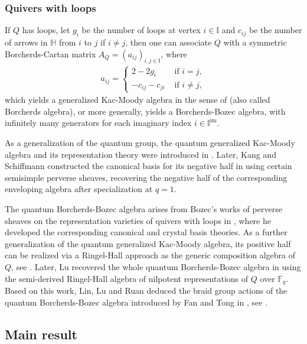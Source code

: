 \documentclass[12pt]{amsart}
\theoremstyle{definition}
\numberwithin{equation}{section}
\begin{document}
\subsubsection{Quivers with loops}\;

If $ Q $ has loops, let $ g_i $ be the number of loops at vertex $ i \in \mathbb{I} $ and $ c_{ij} $ be the number of arrows in $ \mathbb{H} $ from $ i $ to $ j $ if $ i \neq j $, then one can associate $
 Q $ with a symmetric Borcherds-Cartan matrix $ A_Q= (a_{ij})_{i,j \in \mathbb{I}} $, where
\begin{align*}
    a_{ij} = \begin{cases}
        2 - 2 g_i &\text{ if } i = j,\\
        -c_{ij}-c_{ji} &\text{ if } i \neq j,
    \end{cases}
\end{align*}
which yields a generalized Kac-Moody algebra in the sense of \cite{Borcherds88} (also called Borcherds algebra), or more generally, yields a Borcherds-Bozec algebra, with infinitely many generators for each imaginary index $ i \in \mathbb{I}^{\mathrm{im}} $. 

As a generalization of the quantum group, the quantum generalized Kac-Moody algebra and its representation theory were introduced in \cite{Kang95}. 
Later, Kang and Schiffmann constructed the canonical basis for its negative half in \cite{KangSchiffmann06} using certain semisimple perverse sheaves, recovering the negative half of the corresponding enveloping algebra after specialization at $ q=1 $.

The quantum Borcherds-Bozec algebra arises from Bozec's works of perverse sheaves on the representation varieties of quivers with loops in \cite{Bozec15,Bozec16}, where he developed the corresponding canonical and crystal basis theories. 
As a further generalization of the quantum generalized Kac-Moody algebra, its positive half can be realized via a Ringel-Hall approach as the generic composition algebra of $ Q $, see \cite{Kang18}.
Later, Lu recovered the whole quantum Borcherds-Bozec algebra in \cite{L23} using the semi-derived Ringel-Hall algebra of nilpotent representations of $ Q $ over $ \mathbb{F}_q $. 
Based on this work, Lin, Lu and Ruan deduced the braid group actions of the quantum Borcherds-Bozec algebra introduced by Fan and Tong in \cite{FT23}, see \cite{LLR23}. 


\subsection{Main result}\;
\end{document}
